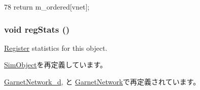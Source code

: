 \begin{DoxyCode}
78 { return m_ordered[vnet]; }
\end{DoxyCode}
\hypertarget{classBaseGarnetNetwork_a4dc637449366fcdfc4e764cdf12d9b11}{
\subsubsection[{regStats}]{\setlength{\rightskip}{0pt plus 5cm}void regStats ()}}
\label{classBaseGarnetNetwork_a4dc637449366fcdfc4e764cdf12d9b11}
\hyperlink{classRegister}{Register} statistics for this object. 

\hyperlink{classSimObject_a4dc637449366fcdfc4e764cdf12d9b11}{SimObject}を再定義しています。

\hyperlink{classGarnetNetwork__d_a4dc637449366fcdfc4e764cdf12d9b11}{GarnetNetwork\_\-d}, と \hyperlink{classGarnetNetwork_a4dc637449366fcdfc4e764cdf12d9b11}{GarnetNetwork}で再定義されています。


